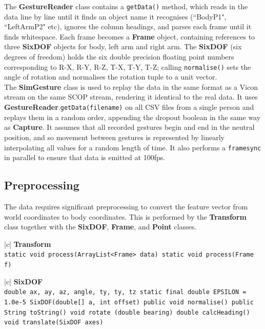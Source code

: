 \documentclass[12pt,a4,notitlepage]{report}
\renewcommand{\_}{\texttt{\symbol{95}}}
\newcommand{\<}{\texttt{\symbol{60}}}
\renewcommand{\>}{\texttt{\symbol{62}}}
\newcommand{\class}[1]{\textbf{#1}}
\newcommand{\variable}[1]{\texttt{#1}}
\begin{document}
The \class{GestureReader} class contains a \variable{getData()} method, which reads in the data line by line until it finds an object name it recognises (``BodyP1", ``LeftArmP2" etc), ignores the column headings, and parses each frame until it finds whitespace. Each frame becomes a \class{Frame} object, containing references to three \class{SixDOF} objects for body, left arm and right arm. The \class{SixDOF} (six degrees of freedom) holds the six double precision floating point numbers corresponding to \<R-X\>, \<R-Y\>, \<R-Z\>, \<T-X\>, \<T-Y\>, \<T-Z\>; calling \variable{normalise()} sets the angle of rotation and normalises the rotation tuple to a unit vector. \\
The \class{SimGesture} class is used to replay the data in the same format as a Vicon stream on the same SCOP stream, rendering it identical to the real data. It uses \class{GestureReader}.\variable{getData(filename)} on all CSV files from a single person and replays them in a random order, appending the dropout boolean in the same way as \class{Capture}. It assumes that all recorded gestures begin and end in the neutral position, and so movement between gestures is represented by linearly interpolating all values for a random length of time. It also performs a \variable{framesync} in parallel to ensure that data is emitted at 100fps.


\subsection{Preprocessing}

The data requires significant preprocessing to convert the feature vector from world coordinates to body coordinates. This is performed by the \class{Transform} class together with the \class{SixDOF}, \class{Frame}, and \class{Point} classes.

\begin{tabular}{|c|} \hline 
\class{Transform} \\ \hline
{}
{ \variable{static void process(ArrayList<Frame> data) \newline
static void process(Frame f)
} } \\ \hline
\end{tabular}

\begin{tabular}{|c|} \hline 
\class{SixDOF} \\ \hline
{}
{\variable{double ax, ay, az, angle, ty, ty, tz \newline
  static final double EPSILON = 1.0e-5 \newline
  SixDOF(double[] a, int offset) \newline
  public void normalise() \newline
  public String toString() \newline
  void rotate (double bearing) \newline
  double calcHeading() \newline
  void translate(SixDOF axes)
} } \\ \hline
\end{tabular}
\end{document}
